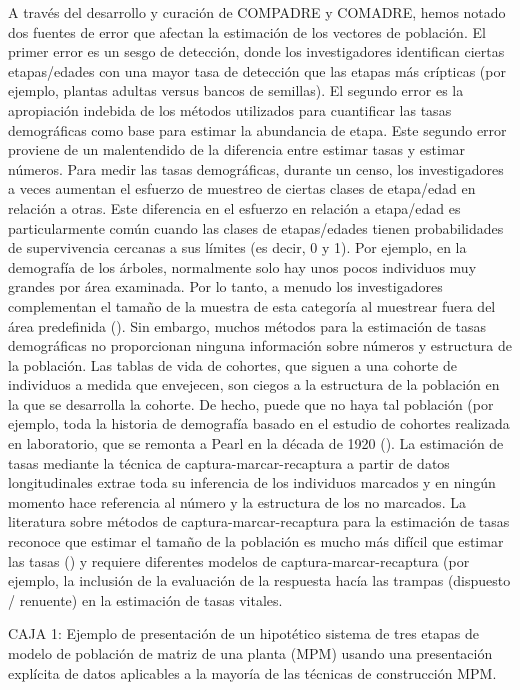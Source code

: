 \documentclass[
]{book}
\theoremstyle{definition}
\theoremstyle{definition}
\theoremstyle{definition}
\theoremstyle{definition}
\theoremstyle{remark}
\begin{document}
A través del desarrollo y curación de COMPADRE y COMADRE, hemos notado dos fuentes de error que afectan la estimación de los vectores de población. El primer error es un sesgo de detección, donde los investigadores identifican ciertas etapas/edades con una mayor tasa de detección que las etapas más crípticas (por ejemplo, plantas adultas versus bancos de semillas). El segundo error es la apropiación indebida de los métodos utilizados para cuantificar las tasas demográficas como base para estimar la abundancia de etapa. Este segundo error proviene de un malentendido de la diferencia entre estimar tasas y estimar números. Para medir las tasas demográficas, durante un censo, los investigadores a veces aumentan el esfuerzo de muestreo de ciertas clases de etapa/edad en relación a otras. Este diferencia en el esfuerzo en relación a etapa/edad es particularmente común cuando las clases de etapas/edades tienen probabilidades de supervivencia cercanas a sus límites (es decir, 0 y 1). Por ejemplo, en la demografía de los árboles, normalmente solo hay unos pocos individuos muy grandes por área examinada. Por lo tanto, a menudo los investigadores complementan el tamaño de la muestra de esta categoría al muestrear fuera del área predefinida (\citet{jones2006demographic}). Sin embargo, muchos métodos para la estimación de tasas demográficas no proporcionan ninguna información sobre números y estructura de la población. Las tablas de vida de cohortes, que siguen a una cohorte de individuos a medida que envejecen, son ciegos a la estructura de la población en la que se desarrolla la cohorte. De hecho, puede que no haya tal población (por ejemplo, toda la historia de demografía basado en el estudio de cohortes realizada en laboratorio, que se remonta a Pearl en la década de 1920 (\citet{pearl1927experimental}). La estimación de tasas mediante la técnica de captura-marcar-recaptura a partir de datos longitudinales extrae toda su inferencia de los individuos marcados y en ningún momento hace referencia al número y la estructura de los no marcados. La literatura sobre métodos de captura-marcar-recaptura para la estimación de tasas reconoce que estimar el tamaño de la población es mucho más difícil que estimar las tasas (\citet{lebreton1992modeling}) y requiere diferentes modelos de captura-marcar-recaptura (por ejemplo, la inclusión de la evaluación de la respuesta hacía las trampas (dispuesto / renuente) en la estimación de tasas vitales.

CAJA 1: Ejemplo de presentación de un hipotético sistema de tres etapas de modelo de población de matriz de una planta (MPM) usando una presentación explícita de datos aplicables a la mayoría de las técnicas de construcción MPM.
\end{document}
